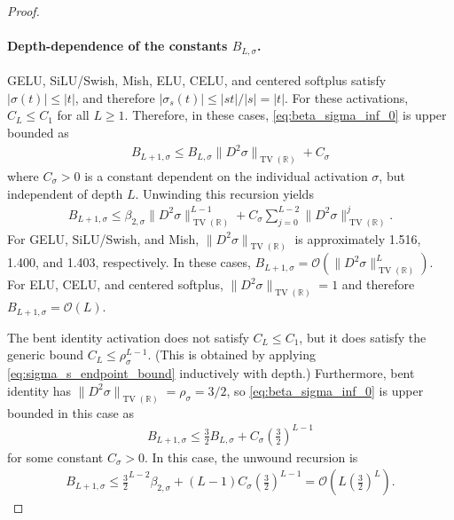 \documentclass{article}
\DeclareMathOperator{\TV}{TV}
\def\cO{{\mathcal{O}}}
\newcommand{\R}{\mathbb{R}}
\begin{document}
\begin{appendices}
\begin{proof}
    \paragraph{Depth-dependence of the constants $B_{L,\sigma}$.}
    
    GELU, SiLU/Swish, Mish, ELU, CELU, and centered softplus satisfy $|\sigma(t)| \leq |t|$, and therefore $|\sigma_s(t)| \leq |st|/|s| = |t|$. For these activations, $C_L \leq C_1$ for all $L \geq 1$. Therefore, in these cases, \eqref{eq:beta_sigma_inf_0} is upper bounded as 
    \begin{align}
        B_{L+1,\sigma} \leq  B_{L,\sigma} \| D^2 \sigma \|_{\TV(\R)} + C_\sigma
    \end{align}
    where $C_\sigma > 0$ is a constant dependent on the individual activation $\sigma$, but independent of depth $L$. Unwinding this recursion yields
    \begin{align}
        B_{L+1,\sigma} \leq \beta_{2,\sigma} \| D^2 \sigma \|_{\TV(\R)}^{L-1} + C_\sigma \sum_{j=0}^{L-2} \| D^2 \sigma \|_{\TV(\R)}^j.
    \end{align}
    For GELU, SiLU/Swish, and Mish, $\| D^2 \sigma \|_{\TV(\R)}$ is approximately 1.516, 1.400, and 1.403, respectively. In these cases, $B_{L+1,\sigma} = \cO(\| D^2 \sigma \|_{\TV(\R)}^L  )$. For ELU, CELU, and centered softplus, $\| D^2 \sigma \|_{\TV(\R)} = 1$ and therefore $B_{L+1,\sigma} = \cO(L)$.

    The bent identity activation does not satisfy $C_L \leq C_1$, but it does satisfy the generic bound $C_L \leq \rho_\sigma^{L-1}$. (This is obtained by applying \eqref{eq:sigma_s_endpoint_bound} inductively with depth.) Furthermore, bent identity has $\| D^2 \sigma \|_{\TV(\R)} = \rho_\sigma = 3/2$, so \eqref{eq:beta_sigma_inf_0} is upper bounded in this case as 
    \begin{align}
        B_{L+1,\sigma} \leq  \frac{3}{2} B_{L,\sigma}  + C_\sigma \left( \frac{3}{2} \right)^{L-1}
    \end{align}
    for some constant $C_\sigma > 0$. In this case, the unwound recursion is
    \begin{align}
        B_{L+1,\sigma} \leq  \frac{3}{2}^{L-2} \beta_{2,\sigma}  + (L-1) C_\sigma \left( \frac{3}{2} \right)^{L-1} = \cO \left( L \left( \frac{3}{2} \right)^L \right).
    \end{align}


\end{proof}
\end{appendices}
\end{document}

